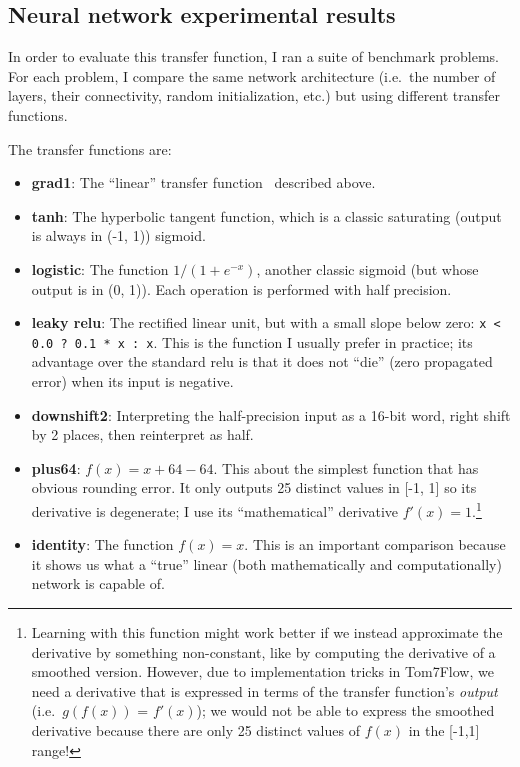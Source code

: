 \documentclass[twocolumn]{article}
\begin{document}
\subsection{Neural network experimental results}
In order to evaluate this transfer function, I ran a suite of
benchmark problems. For each problem, I compare the same network
architecture (i.e.~the number of layers, their connectivity, random
initialization, etc.) but using different transfer functions.

The transfer functions are:

\begin{itemize}
\item {\bf grad1}: The ``linear'' transfer function \gradone\ described above.
\item {\bf tanh}: The hyperbolic tangent function, which is a classic saturating (output is always in (-1, 1)) sigmoid.
\item {\bf logistic}: The function $1 / (1 + e^{-x})$, another classic sigmoid (but whose output is in (0, 1)). Each operation is performed with half precision.
\item {\bf leaky relu}: The rectified linear unit, but with a small slope below zero: \verb|x < 0.0 ? 0.1 * x : x|. This is the function I usually prefer in practice; its advantage over the standard relu is that it does not ``die'' (zero propagated error) when its input is negative.
\item {\bf downshift2}: Interpreting the half-precision input as a 16-bit word, right shift by 2 places, then reinterpret as half.
\item {\bf plus64}: $f(x) = x + 64 - 64$. This about the simplest function that has obvious rounding error. It only outputs 25 distinct values in [-1, 1] so its derivative is degenerate; I use its ``mathematical'' derivative $f'(x) = 1$.\footnote{Learning with this function might work better if we instead approximate the derivative by something non-constant, like by computing the derivative of a smoothed version. However, due to implementation tricks in Tom7Flow, we need a derivative that is expressed in terms of the transfer function's {\it output} (i.e.~$g(f(x))$ = $f'(x)$); we would not be able to express the smoothed derivative because there are only 25 distinct values of $f(x)$ in the [-1,1] range!}
\item {\bf identity}: The function $f(x) = x$. This is an important comparison because it shows us what a ``true'' linear (both mathematically and computationally) network is capable of.
\end{itemize}
\end{document}
